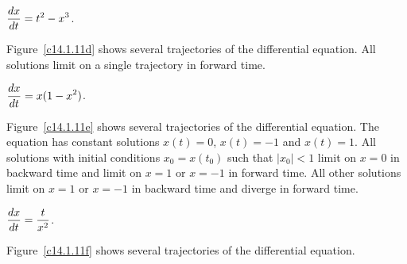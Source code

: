 \documentclass{ximera}
\begin{document}
\begin{computerExercise} \label{c14.1.11d}
$\displaystyle\frac{dx}{dt} = t^2 - x^3$.

\begin{solution}
Figure~\ref{c14.1.11d} shows several trajectories of the
differential equation.  All solutions limit on a single trajectory in
forward time.

\begin{figure}[htb]
                       \centerline{%
                       }
\end{figure}

\end{solution}
\end{computerExercise}
\begin{computerExercise} \label{c14.1.11e}
$\displaystyle\frac{dx}{dt} = x(1-x^2)$.

\begin{solution}
Figure~\ref{c14.1.11e} shows several trajectories of the
differential equation.  The equation has constant solutions $x(t) = 0$,
$x(t) = -1$ and $x(t) = 1$.  All solutions with initial conditions
$x_0 = x(t_0)$ such that $|x_0| < 1$ limit on $x = 0$ in backward time and
limit on $x = 1$ or $x = -1$ in forward time.  All other solutions limit
on $x = 1$ or $x = -1$ in backward time and diverge in forward time.

\begin{figure}[htb]
                       \centerline{%
                       }
\end{figure}


\end{solution}
\end{computerExercise}
\begin{computerExercise} \label{c14.1.11f}
$\displaystyle\frac{dx}{dt} = \frac{t}{x^2}$.

\begin{solution}
Figure~\ref{c14.1.11f} shows several trajectories of the
differential equation.

\begin{figure}[htb]
                       \centerline{%
                       }
\end{figure}

\end{solution}
\end{computerExercise}
\end{document}
